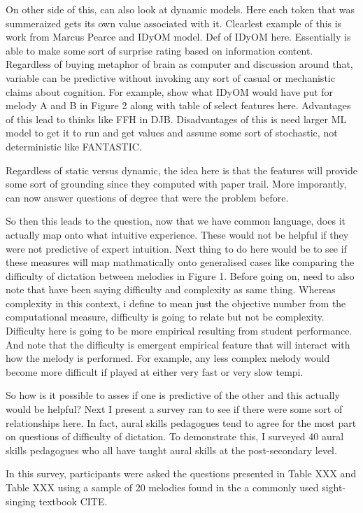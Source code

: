 \documentclass[english,man,floatsintext]{apa6}
\begin{document}
On other side of this, can also look at dynamic models.
Here each token that was summeraized gets its own value associated with it.
Clearlest example of this is work from Marcus Pearce and IDyOM model.
Def of IDyOM here.
Essentially is able to make some sort of surprise rating based on information content.
Regardless of buying metaphor of brain as computer and discussion around that, variable can be predictive without invoking any sort of casual or mechanistic claims about cognition.
For example, show what IDyOM would have put for melody A and B in Figure 2 along with table of select features here.
Advantages of this lead to thinks like FFH in DJB.
Disadvantages of this is need larger ML model to get it to run and get values and assume some sort of stochastic, not deterministic like FANTASTIC.

Regardless of static versus dynamic, the idea here is that the features will provide some sort of grounding since they computed with paper trail.
More imporantly, can now answer questions of degree that were the problem before.

So then this leads to the question, now that we have common language, does it actually map onto what intuitive experience.
These would not be helpful if they were not predictive of expert intuition.
Next thing to do here would be to see if these measures will map mathmatically onto generalised cases like comparing the difficulty of dictation between melodies in Figure 1.
Before going on, need to also note that have been saying difficulty and complexity as same thing.
Whereas complexity in this context, i define to mean just the objective number from the computational measure, difficulty is going to relate but not be complexity.
Difficulty here is going to be more empirical resulting from student performance.
And note that the difficulty is emergent empirical feature that will interact with how the melody is performed.
For example, any less complex melody would become more difficult if played at either very fast or very slow tempi.

So how is it possible to asses if one is predictive of the other and this actually would be helpful?
Next I present a survey ran to see if there were some sort of relationships here.
In fact, aural skills pedagogues tend to agree for the most part on questions of difficulty of dictation.
To demonstrate this, I surveyed 40 aural skills pedagogues who all have taught aural skills at the post-secondary level.

In this survey, participants were asked the questions presented in Table XXX and Table XXX using a sample of 20 melodies found in the a commonly used sight-singing textbook CITE.
\end{document}
